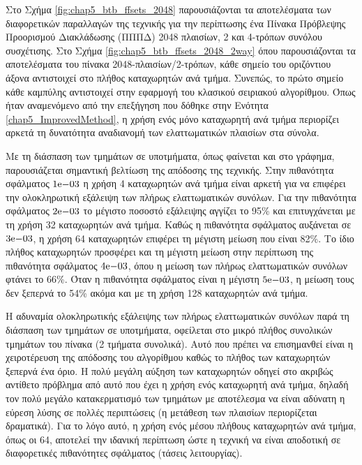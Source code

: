 Στο Σχήμα \ref{fig:chap5_btb_ffsets_2048} παρουσιάζονται τα αποτελέσματα των διαφορετικών παραλλαγών της τεχνικής για την περίπτωσης ένα Πίνακα Πρόβλεψης Προορισμού Διακλάδωσης (ΠΠΠΔ) 2048 πλαισίων, 2 και 4-τρόπων συνόλου συσχέτισης. Στο Σχήμα \ref{fig:chap5_btb_ffsets_2048_2way} όπου παρουσιάζονται τα αποτελέσματα του πίνακα 2048-πλαισίων/2-τρόπων, κάθε σημείο του οριζόντιου άξονα αντιστοιχεί στο πλήθος καταχωρητών ανά τμήμα. Συνεπώς, το πρώτο σημείο κάθε καμπύλης αντιστοιχεί στην εφαρμογή του κλασικού σειριακού αλγορίθμου. Όπως ήταν αναμενόμενο από την επεξήγηση που δόθηκε στην Ενότητα \ref{chap5_ImprovedMethod}, η χρήση ενός μόνο καταχωρητή ανά τμήμα περιορίζει αρκετά τη δυνατότητα αναδιανομή των ελαττωματικών πλαισίων στα σύνολα.
\par
Με τη διάσπαση των τμημάτων σε υποτμήματα, όπως φαίνεται και στο γράφημα, παρουσιάζεται σημαντική βελτίωση της απόδοσης της τεχνικής. Στην πιθανότητα σφάλματος $1\mathrm{e}{-03}$ η χρήση 4 καταχωρητών ανά τμήμα είναι αρκετή για να επιφέρει την ολοκληρωτική εξάλειψη των πλήρως ελαττωματικών συνόλων. Για την πιθανότητα σφάλματος $2\mathrm{e}{-03}$ το μέγιστο ποσοστό εξάλειψης αγγίζει το 95\% και επιτυγχάνεται με τη χρήση 32 καταχωρητών ανά τμήμα. Καθώς η πιθανότητα σφάλματος αυξάνεται σε $3\mathrm{e}{-03}$, η χρήση 64 καταχωρητών επιφέρει τη μέγιστη μείωση που είναι 82\%. Το ίδιο πλήθος καταχωρητών προσφέρει και τη μέγιστη μείωση στην περίπτωση της πιθανότητα σφάλματος $4\mathrm{e}{-03}$, όπου η μείωση των πλήρως ελαττωματικών συνόλων φτάνει το 66\%. Όταν η πιθανότητα σφάλματος είναι η μέγιστη $5\mathrm{e}{-03}$, η μείωση τους δεν ξεπερνά το 54\% ακόμα και με τη χρήση 128 καταχωρητών ανά τμήμα.
\par
Η αδυναμία ολοκληρωτικής εξάλειψης των πλήρως ελαττωματικών συνόλων παρά τη διάσπαση των τμημάτων σε υποτμήματα, οφείλεται στο μικρό πλήθος συνολικών τμημάτων του πίνακα (2 τμήματα συνολικά). Αυτό που πρέπει να επισημανθεί είναι η χειροτέρευση της απόδοσης του αλγορίθμου καθώς το πλήθος των καταχωρητών ξεπερνά ένα όριο. Η πολύ μεγάλη αύξηση των καταχωρητών οδηγεί στο ακριβώς αντίθετο πρόβλημα από αυτό που έχει η χρήση ενός καταχωρητή ανά τμήμα, δηλαδή τον πολύ μεγάλο κατακερματισμό των τμημάτων με αποτέλεσμα να είναι αδύνατη η εύρεση λύσης σε πολλές περιπτώσεις (η μετάθεση των πλαισίων περιορίζεται δραματικά). Για το λόγο αυτό, η χρήση ενός μέσου πλήθους καταχωρητών ανά τμήμα, όπως οι 64, αποτελεί την ιδανική περίπτωση ώστε η τεχνική να είναι αποδοτική σε διαφορετικές πιθανότητες σφάλματος (τάσεις λειτουργίας).


